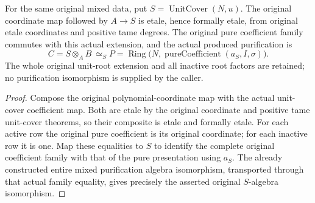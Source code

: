 \begin{lemma}
\label{lem:kn-global-trace-actual-purification}
\leanok
For the same original mixed data, put $S=\operatorname{UnitCover}(N,u)$.
The original coordinate map followed by $A\to S$ is etale, hence formally
etale, from original etale coordinates and positive tame degrees.  The
original pure coefficient family commutes with this actual extension,
and the actual produced purification is
\[
 C=S\otimes_A B\ \simeq_S
 P=\operatorname{Ring}\bigl(N,\operatorname{pureCoefficient}(a_S,I,\sigma)\bigr).
\]
The whole original unit-root extension and all inactive root factors are
retained; no purification isomorphism is supplied by the caller.
\end{lemma}
\begin{proof}
Compose the original polynomial-coordinate map with the actual unit-cover
coefficient map.  Both are etale by the original coordinate and positive
tame unit-cover theorems, so their composite is etale and formally etale.
For each active row the original pure coefficient is its original
coordinate; for each inactive row it is one.  Map these equalities to
$S$ to identify the complete original coefficient family with that of
the pure presentation using $a_S$.  The already constructed entire mixed
purification algebra isomorphism, transported through that actual family
equality, gives precisely the asserted original $S$-algebra isomorphism.
\end{proof}

